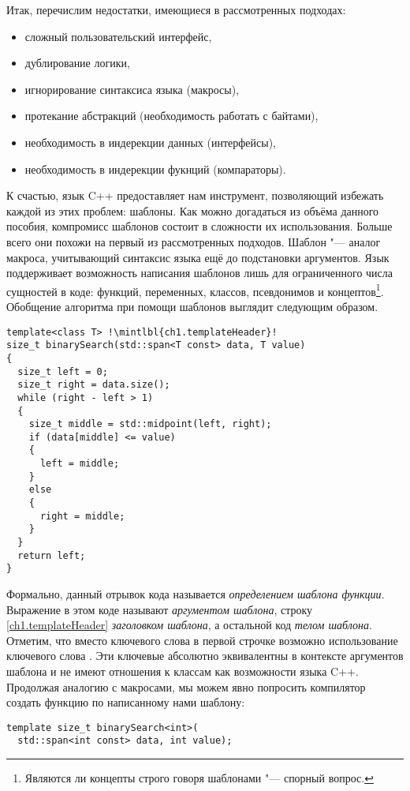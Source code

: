 Итак, перечислим недостатки, имеющиеся в рассмотренных подходах:
\begin{itemize}
\item сложный пользовательский интерфейс,
\item дублирование логики,
\item игнорирование синтаксиса языка (макросы),
\item протекание абстракций (необходимость работать с байтами),
\item необходимость в индерекции данных (интерфейсы),
\item необходимость в индерекции фукнций (компараторы).
\end{itemize}
К счастью, язык C++ предоставляет нам инструмент, позволяющий избежать каждой из этих проблем: шаблоны.
Как можно догадаться из объёма данного пособия, компромисс шаблонов состоит в сложности их использования.
Больше всего они похожи на первый из рассмотренных подходов.
Шаблон "--- аналог макроса, учитывающий синтаксис языка ещё до подстановки аргументов.
Язык поддерживает возможность написания шаблонов лишь для ограниченного числа сущностей в коде: функций, переменных, классов, псевдонимов и концептов\footnote{Являются ли концепты строго говоря шаблонами "--- спорный вопрос.}.
Обобщение алгоритма  при помощи шаблонов выглядит следующим образом.
\begin{verbatim}
template<class T> !\mintlbl{ch1.templateHeader}!
size_t binarySearch(std::span<T const> data, T value)
{
  size_t left = 0;
  size_t right = data.size();
  while (right - left > 1)
  {
    size_t middle = std::midpoint(left, right);
    if (data[middle] <= value)
    {
      left = middle;
    }
    else
    {
      right = middle;
    }
  }
  return left;
}
\end{verbatim}
Формально, данный отрывок кода называется \textit{определением шаблона функции}.
Выражение  в этом коде называют \textit{аргументом шаблона}, строку \ref{ch1.templateHeader} \textit{заголовком шаблона}, а остальной код \textit{телом шаблона}.
Отметим, что вместо ключевого слова  в первой строчке возможно использование ключевого слова .
Эти ключевые абсолютно эквивалентны в контексте аргументов шаблона и не имеют отношения к классам как возможности языка C++.
Продолжая аналогию с макросами, мы можем явно попросить компилятор создать функцию по написанному нами шаблону:
\begin{verbatim}
template size_t binarySearch<int>(
  std::span<int const> data, int value);
\end{verbatim}
